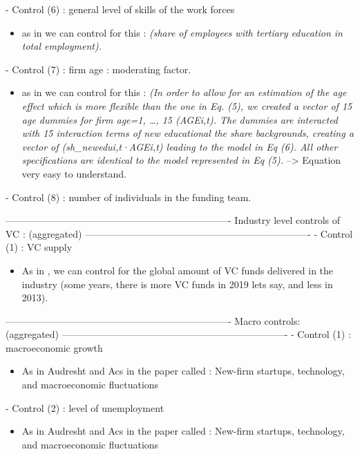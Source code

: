 \begin{itemize}
\begin{itemize}
- Control (6) : general level of skills of the work forces
\begin{itemize}
  \item as in \citet{grillitsch2020does} we can control for this : \textit{(share of employees with tertiary education in total employment).}
\end{itemize}

- Control (7) : firm age : moderating factor.
\begin{itemize}
  \item as in \citet{grillitsch2020does} we can control for this : \textit{(In order to allow for an estimation of the age effect which is more flexible than the one in Eq. (5), we created a vector of 15 age dummies for firm age=1, …, 15 (AGEi,t). The dummies are interacted with 15 interaction terms of new educational the share backgrounds, creating a vector of (sh_newedui,t·AGEi,t) leading to the model in Eq (6). All other specifications are identical to the model represented in Eq (5).} --> Equation very easy to understand.
\end{itemize}

- Control (8) : number of individuals in the funding team.

----------------------------------------------------------------------
Industry level controls of VC : (aggregated)
----------------------------------------------------------------------
- Control (1) : VC supply
\begin{itemize}
  \item As in \citet{beckman2007early}, we can control for the global amount of VC funds delivered in the industry (some years, there is more VC funds in 2019 lets say, and less in 2013).
\end{itemize}

----------------------------------------------------------------------
Macro controls: (aggregated)
----------------------------------------------------------------------
- Control (1) : macroeconomic growth
\begin{itemize}
  \item As in Audresht and Acs in the paper called : New-firm startups, technology, and macroeconomic fluctuations
\end{itemize}

- Control (2) : level of unemployment
\begin{itemize}
  \item As in Audresht and Acs in the paper called : New-firm startups, technology, and macroeconomic fluctuations
\end{itemize}


\end{itemize}
\end{itemize}

